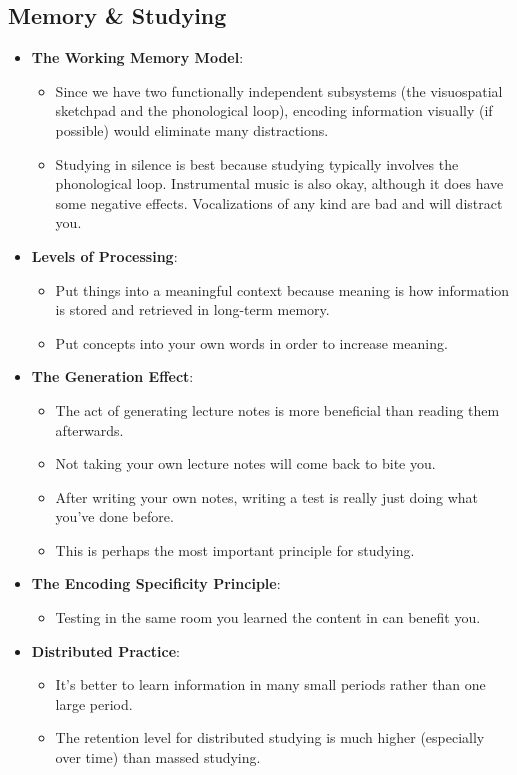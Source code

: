 \documentclass[]{article}
\begin{document}
		\subsection{Memory \& Studying}
			\begin{itemize}
				\item \textbf{The Working Memory Model}:
					\begin{itemize}
						\item Since we have two functionally independent subsystems (the visuospatial sketchpad and the phonological loop), encoding information visually (if possible) would eliminate many distractions.
						\item Studying in silence is best because studying typically involves the phonological loop. Instrumental music is also okay, although it does have some negative effects. Vocalizations of any kind are bad and will distract you.
					\end{itemize}

				\item \textbf{Levels of Processing}:
					\begin{itemize}
						\item Put things into a meaningful context because meaning is how information is stored and retrieved in long-term memory.
						\item Put concepts into your own words in order to increase meaning.
					\end{itemize}

				\item \textbf{The Generation Effect}:
					\begin{itemize}
						\item The act of generating lecture notes is more beneficial than reading them afterwards.
						\item Not taking your own lecture notes will come back to bite you.
						\item After writing your own notes, writing a test is really just doing what you've done before.
						\item This is perhaps the most important principle for studying.
					\end{itemize}

				\item \textbf{The Encoding Specificity Principle}:
					\begin{itemize}
						\item Testing in the same room you learned the content in can benefit you.
					\end{itemize}

				\item \textbf{Distributed Practice}:
					\begin{itemize}
						\item It's better to learn information in many small periods rather than one large period.
						\item The retention level for distributed studying is much higher (especially over time) than massed studying.
					\end{itemize}
			\end{itemize}
\end{document}
